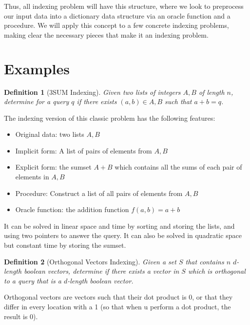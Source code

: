 \documentclass{article}
\newtheorem{definition}{Definition}
\begin{document}
Thus, all indexing problem will have this structure, where we look to preprocess our input data into a dictionary data structure via an oracle function and a procedure. We will apply this concept to a few concrete indexing problems, making clear the necessary pieces that make it an indexing problem.

\section{Examples}
\label{sec:examples}
\begin{definition}[3SUM Indexing]
Given two lists of integers $A,B$ of length $n$, determine for a query $q$ if there exists $(a,b) \in A,B$ such that $a+b=q$.
\end{definition}
The indexing version of this classic problem has the following features:
\begin{itemize}
    \item Original data: two lists $A,B$
    \item Implicit form: A list of pairs of elements from $A,B$
    \item Explicit form: the sumset $A+B$ which contains all the sums of each pair of elements in $A,B$
    \item Procedure: Construct a list of all pairs of elements from $A,B$
    \item Oracle function: the addition function $f(a,b) = a+b$
\end{itemize}
It can be solved in linear space and time by sorting and storing the lists, and using two pointers to answer the query. It can also be solved in quadratic space but constant time by storing the sumset.
\begin{definition}[Orthogonal Vectors Indexing]
Given a set $S$ that contains $n$ $d$-length boolean vectors, determine if there exists a vector in $S$ which is orthogonal to a query that is a $d$-length boolean vector.
\end{definition}
Orthogonal vectors are vectors such that their dot product is 0, or that they differ in every location with a 1 (so that when u perform a dot product, the result is 0).
\end{document}
